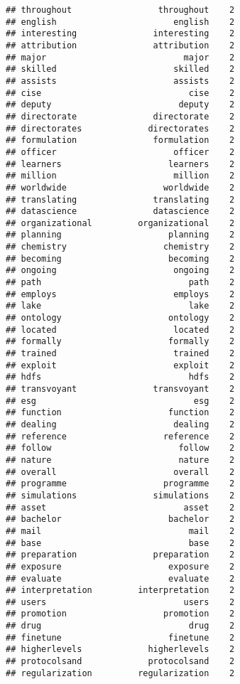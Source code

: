 \documentclass[]{article}
\begin{document}
\begin{verbatim}
## throughout                 throughout    2
## english                       english    2
## interesting               interesting    2
## attribution               attribution    2
## major                           major    2
## skilled                       skilled    2
## assists                       assists    2
## cise                             cise    2
## deputy                         deputy    2
## directorate               directorate    2
## directorates             directorates    2
## formulation               formulation    2
## officer                       officer    2
## learners                     learners    2
## million                       million    2
## worldwide                   worldwide    2
## translating               translating    2
## datascience               datascience    2
## organizational         organizational    2
## planning                     planning    2
## chemistry                   chemistry    2
## becoming                     becoming    2
## ongoing                       ongoing    2
## path                             path    2
## employs                       employs    2
## lake                             lake    2
## ontology                     ontology    2
## located                       located    2
## formally                     formally    2
## trained                       trained    2
## exploit                       exploit    2
## hdfs                             hdfs    2
## transvoyant               transvoyant    2
## esg                               esg    2
## function                     function    2
## dealing                       dealing    2
## reference                   reference    2
## follow                         follow    2
## nature                         nature    2
## overall                       overall    2
## programme                   programme    2
## simulations               simulations    2
## asset                           asset    2
## bachelor                     bachelor    2
## mail                             mail    2
## base                             base    2
## preparation               preparation    2
## exposure                     exposure    2
## evaluate                     evaluate    2
## interpretation         interpretation    2
## users                           users    2
## promotion                   promotion    2
## drug                             drug    2
## finetune                     finetune    2
## higherlevels             higherlevels    2
## protocolsand             protocolsand    2
## regularization         regularization    2

\end{verbatim}
\end{document}
